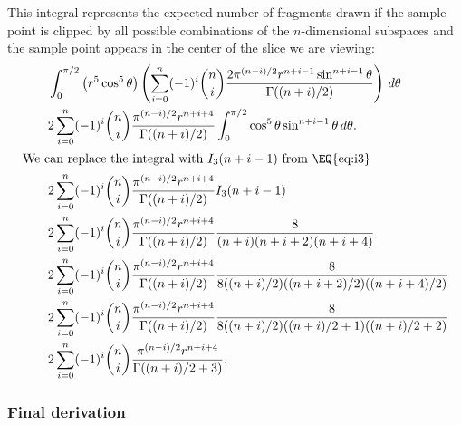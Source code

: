\begin{lem}

This integral represents the expected number of fragments drawn if the sample
point is clipped by all possible combinations of the $n$-dimensional 
subspaces and the sample point appears in the center of the slice we are 
viewing:
\begin{align*}
  \qquad & \int_{0}^{\pi/2}
           \left(r^5 \cos^5 \theta\right)
           \left(
             \sum_{i=0}^{n} (-1)^i {n \choose i}
                            \frac{2\pi^{(n-i)/2} r^{n+i-1} \sin^{n+i-1} \theta}
                                 {\Gamma((n+i)/2)} 
           \right) \, d\theta \\
  \qquad & 2 \sum_{i=0}^{n} (-1)^i {n \choose i}
                            \frac{\pi^{(n-i)/2} r^{n+i+4}}
                                 {\Gamma((n+i)/2)} 
           \int_{0}^{\pi/2} \cos^5 \theta \sin^{n+i-1} \theta \, d\theta \text{.}\\
\intertext{We can replace the integral with $I_3(n+i-1)$ from \EQ{eq:i3}}
  \qquad & 2 \sum_{i=0}^{n} (-1)^i {n \choose i}
                            \frac{\pi^{(n-i)/2} r^{n+i+4}}
                                 {\Gamma((n+i)/2)} 
           I_3(n+i-1) \\
   \qquad & 2 \sum_{i=0}^{n} (-1)^i {n \choose i}
                            \frac{\pi^{(n-i)/2} r^{n+i+4}}
                                 {\Gamma((n+i)/2)} 
           \frac{8}{(n+i)(n+i+2)(n+i+4)} \\
   \qquad & 2 \sum_{i=0}^{n} (-1)^i {n \choose i}
                            \frac{\pi^{(n-i)/2} r^{n+i+4}}
                                 {\Gamma((n+i)/2)} 
           \frac{8}{8((n+i)/2)((n+i+2)/2)((n+i+4)/2)} \\
   \qquad & 2 \sum_{i=0}^{n} (-1)^i {n \choose i}
                            \frac{\pi^{(n-i)/2} r^{n+i+4}}
                                 {\Gamma((n+i)/2)} 
           \frac{8}{8((n+i)/2)((n+i)/2+1)((n+i)/2+2)} \\
   \qquad & 2 \sum_{i=0}^{n}(-1)^i {n \choose i}
                            \frac{\pi^{(n-i)/2} r^{n+i+4}}
                                 {\Gamma((n+i)/2+3)}
\text{.}
\end{align*}
\end{lem}

\subsubsection{Final derivation}


